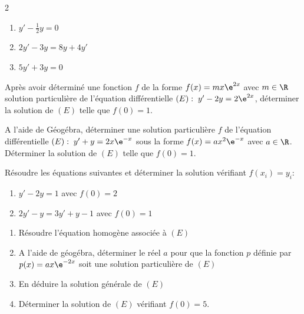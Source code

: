 \def\level{BTS}  %
\def\course{CIEL 2}
\def\chaptername{CIEL2~--~Accompagnement Personnalisé} %
\def\docpart{Equations différentielles AP1} %
\def\docname{C202} %
\pagestyle{cours_FP}
\makeheaderBTS{} %

\begin{multicols}{2}

	\begin{exercice_cours}{}
		\begin{enumerate}
			\item $y'-\frac{1}{2}y=0$
			\item $2y'-3y=8y+4y'$
			\item $5y'+3y=0$
		\end{enumerate}
	\end{exercice_cours}

	\begin{exercice_cours}[\quad]{}
		Après avoir déterminé une fonction $f$ de la forme $f(x)=mx\e^{2x}$ avec $m \in \R$ solution particulière de l'équation différentielle $(E):\; y'-2y=2\e^{2x}$, déterminer la solution de $(E)$ telle que $f(0)=1$.
	\end{exercice_cours}

	\begin{exercice_cours}[\quad]{}
A l'aide de Géogébra, déterminer une solution particulière $f$ de l'équation différentielle $(E):\; y'+y=2x\e^{-x}$ sous la forme $f(x)=ax^2\e^{-x}$ avec $a \in \R$. Déterminer la solution de $(E)$ telle que $f(0)=1$.
	\end{exercice_cours}

		\begin{exercice_cours}[\quad]{}
			Résoudre les équations suivantes et déterminer la solution vérifiant $f(x_i)=y_i$:
			\begin{enumerate}
				\item $y'-2y=1$ avec $f(0)=2$
				\item $2y'-y=3y'+y-1$ avec $f(0)=1$
			\end{enumerate}
		\end{exercice_cours}


\end{multicols}

		\begin{exercice_cours}[	On considère l'équation différentielle $(E):\; y'+2y=4\e^{-2x}$.]{}


			\begin{enumerate}
				\item Résoudre l'équation homogène associée à $(E)$
				\item A l'aide de géogébra, déterminer le réel $a$ pour que la fonction $p$ définie par $p(x)=ax\e^{-2x}$ soit une solution particulière de $(E)$
				\item En déduire la solution générale de $(E)$
				\item Déterminer la solution de $(E)$ vérifiant $f(0)=5$.
			\end{enumerate}
		\end{exercice_cours}



